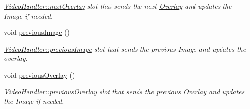 \begin{DoxyCompactItemize}
\begin{DoxyCompactList}\small\item\em \hyperlink{classVideoHandler_a9740f6544f2695785ee84959719da200}{Video\+Handler\+::next\+Overlay} slot that sends the next \hyperlink{classOverlay}{Overlay} and updates the Image if needed. \end{DoxyCompactList}\item 
void \hyperlink{classVideoHandler_a05c7976f85369df034128b99e13515cc}{previous\+Image} ()\hypertarget{classVideoHandler_a05c7976f85369df034128b99e13515cc}{}\label{classVideoHandler_a05c7976f85369df034128b99e13515cc}

\begin{DoxyCompactList}\small\item\em \hyperlink{classVideoHandler_a05c7976f85369df034128b99e13515cc}{Video\+Handler\+::previous\+Image} slot that sends the previous Image and updates the overlay. \end{DoxyCompactList}\item 
void \hyperlink{classVideoHandler_aa438c0abfdb8ddb54d06bf7ce68dc7bc}{previous\+Overlay} ()\hypertarget{classVideoHandler_aa438c0abfdb8ddb54d06bf7ce68dc7bc}{}\label{classVideoHandler_aa438c0abfdb8ddb54d06bf7ce68dc7bc}

\begin{DoxyCompactList}\small\item\em \hyperlink{classVideoHandler_aa438c0abfdb8ddb54d06bf7ce68dc7bc}{Video\+Handler\+::previous\+Overlay} slot that sends the previous \hyperlink{classOverlay}{Overlay} and updates the Image if needed. \end{DoxyCompactList}\end{DoxyCompactItemize}
